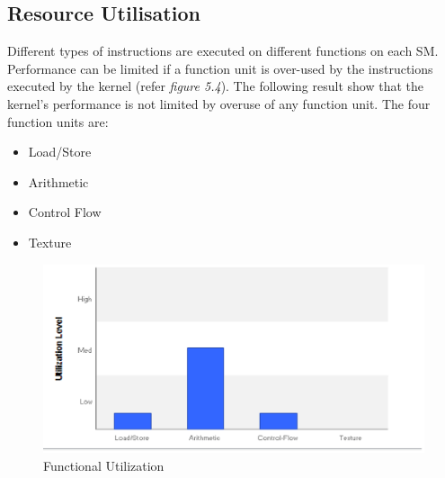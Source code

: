 \documentclass[a4paper,11pt]{report}
\begin{document}
{\subsection{Resource Utilisation}
Different types of instructions are executed on different functions on each SM. Performance can be limited if a function unit is over-used by the instructions executed by the kernel (refer \textit{figure 5.4}). The following result show that the kernel's performance is not limited by overuse of any function unit.
\newline
The four function units are:
\begin{itemize}
  \item Load/Store
  \item Arithmetic
  \item Control Flow
  \item Texture
\end{itemize}
\begin{figure}
  \begin{center}
    \includegraphics{images/utilization_functional}
    \caption{Functional Utilization}
    \label{fig:}
  \end{center}
\end{figure}
}
\end{document}
